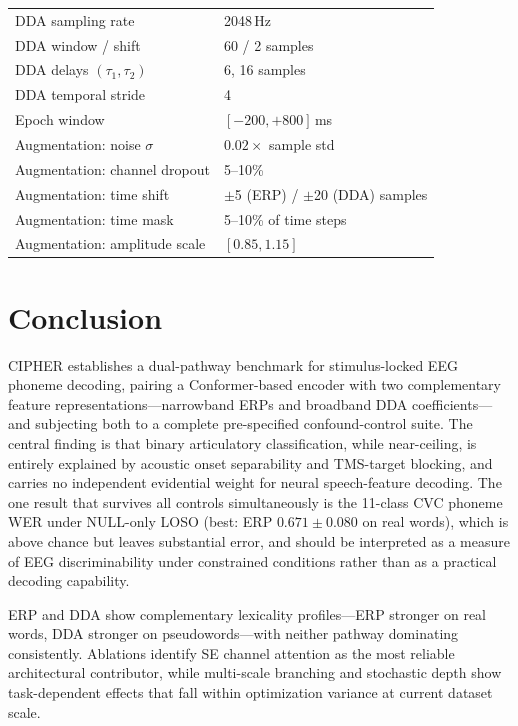 \documentclass[11pt,a4paper]{article}
\begin{document}
\begin{table}[H]
\begin{tabular}{ll}
DDA sampling rate                  & 2048\,Hz \\
DDA window / shift                 & 60 / 2 samples \\
DDA delays $(\tau_1, \tau_2)$      & 6, 16 samples \\
DDA temporal stride                & 4 \\
Epoch window                       & $[-200, +800]$\,ms \\
Augmentation: noise $\sigma$       & $0.02 \times$ sample std \\
Augmentation: channel dropout      & 5--10\% \\
Augmentation: time shift           & $\pm$5 (ERP) / $\pm$20 (DDA) samples \\
Augmentation: time mask            & 5--10\% of time steps \\
Augmentation: amplitude scale      & $[0.85, 1.15]$ \\
\bottomrule
\end{tabular}
\end{table}

\section{Conclusion}

CIPHER establishes a dual-pathway benchmark for stimulus-locked EEG phoneme
decoding, pairing a Conformer-based encoder with two complementary feature
representations---narrowband ERPs and broadband DDA coefficients---and
subjecting both to a complete pre-specified confound-control suite. The
central finding is that binary articulatory classification, while
near-ceiling, is entirely explained by acoustic onset separability and
TMS-target blocking, and carries no independent evidential weight for neural
speech-feature decoding. The one result that survives all controls
simultaneously is the 11-class CVC phoneme WER under NULL-only LOSO (best:
ERP $0.671 \pm 0.080$ on real words), which is above chance but leaves
substantial error, and should be interpreted as a measure of EEG
discriminability under constrained conditions rather than as a practical
decoding capability.

ERP and DDA show complementary lexicality profiles---ERP stronger on real
words, DDA stronger on pseudowords---with neither pathway dominating
consistently. Ablations identify SE channel attention as the most reliable
architectural contributor, while multi-scale branching and stochastic depth
show task-dependent effects that fall within optimization variance at current
dataset scale.
\end{document}
